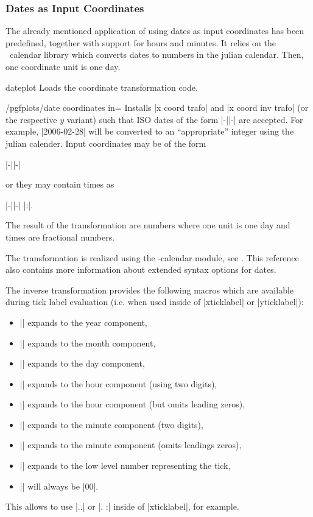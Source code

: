 \subsubsection{Dates as Input Coordinates}
\label{pgfplots:sec:date:coords}
The already mentioned application of using dates as input coordinates has been predefined, together with support for hours and minutes. It relies on the \pgfname\ calendar library which converts dates to numbers in the julian calendar. Then, one coordinate unit is one day.

\begin{tikzlibrary}{dateplot}
	Loads the coordinate transformation code.
\end{tikzlibrary}

\begin{stylekey}{/pgfplots/date coordinates in=}
	Installs |x coord trafo| and |x coord inv trafo| (or the respective $y$ variant) such that ISO dates of the form |-||-| are accepted. For example, |2006-02-28| will be converted to an ``appropriate'' integer using the julian calender. Input coordinates may be of the form
		
		|-||-|

	\noindent or they may contain times as

		|-||-| |:|.

	The result of the transformation are numbers where one unit is one day and times are fractional numbers.

	The transformation is realized using the \pgfname-calendar module, see \cite[Calendar Library]{tikz}. This reference also contains more information about extended syntax options for dates.

	The inverse transformation provides the following macros which are available during tick label evaluation (i.e. when used inside of |xticklabel| or |yticklabel|):
	\begin{itemize}
		\item |\year| expands to the year component,
		\item |\month| expands to the month component,
		\item |\day| expands to the day component,
		\item |\hour| expands to the hour component (using two digits),
		\item |\Hour| expands to the hour component (but omits leading zeros),
		\item |\minute| expands to the minute component (two digits),
		\item |\Minute| expands to the minute component (omits leadings zeros),
		\item |\lowlevel| expands to the low level number representing the tick,
		\item |\second| will always be |00|.
	\end{itemize}
	This allows to use |\day.\month.\year| or |\day. \hour:\minute| inside of |xticklabel|, for example.


\end{stylekey}

